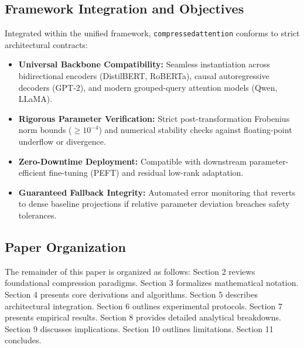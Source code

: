 \subsection{Framework Integration and Objectives}
Integrated within the unified framework, \texttt{compressedattention} conforms to strict architectural contracts:
\begin{itemize}
\item \textbf{Universal Backbone Compatibility:} Seamless instantiation across bidirectional encoders (DistilBERT, RoBERTa), causal autoregressive decoders (GPT-2), and modern grouped-query attention models (Qwen, LLaMA).
\item \textbf{Rigorous Parameter Verification:} Strict post-transformation Frobenius norm bounds ($\ge 10^{-4}$) and numerical stability checks against floating-point underflow or divergence.
\item \textbf{Zero-Downtime Deployment:} Compatible with downstream parameter-efficient fine-tuning (PEFT) and residual low-rank adaptation.
\item \textbf{Guaranteed Fallback Integrity:} Automated error monitoring that reverts to dense baseline projections if relative parameter deviation breaches safety tolerances.
\end{itemize}

\subsection{Paper Organization}
The remainder of this paper is organized as follows: Section 2 reviews foundational compression paradigms. Section 3 formalizes mathematical notation. Section 4 presents core derivations and algorithms. Section 5 describes architectural integration. Section 6 outlines experimental protocols. Section 7 presents empirical results. Section 8 provides detailed analytical breakdowns. Section 9 discusses implications. Section 10 outlines limitations. Section 11 concludes.
